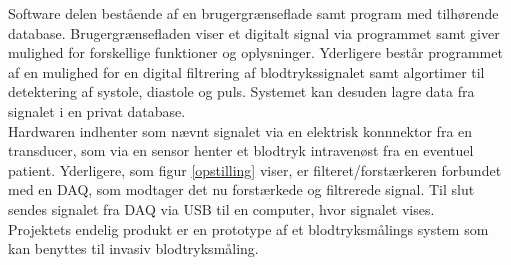 Software delen bestående af en brugergrænseflade samt program med tilhørende database. Brugergrænsefladen viser et digitalt signal via programmet samt giver mulighed for forskellige funktioner og oplysninger. Yderligere består programmet af en mulighed for en digital filtrering af blodtrykssignalet samt algortimer til detektering af systole, diastole og puls. Systemet kan desuden lagre data fra signalet i en privat database.\\[1ex]

Hardwaren indhenter som nævnt signalet via en elektrisk konnnektor fra en transducer, som via en sensor henter et blodtryk intravenøst fra en eventuel patient. Yderligere, som figur \ref{opstilling} viser, er filteret/forstærkeren forbundet med en DAQ, som modtager det nu forstærkede og filtrerede signal. Til slut sendes signalet fra DAQ via USB til en computer, hvor signalet vises.\\[1ex]
Projektets endelig produkt er en prototype af et blodtryksmålings system som kan benyttes til invasiv blodtryksmåling.



